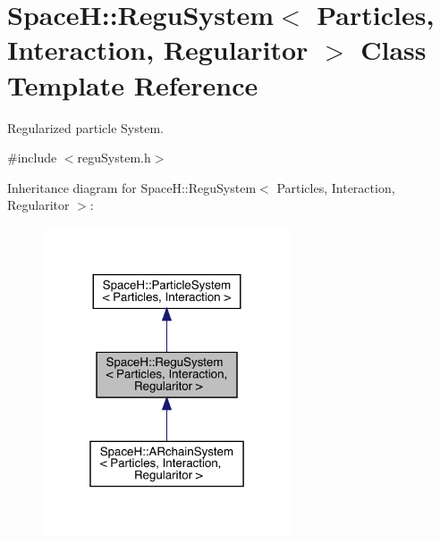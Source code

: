 \hypertarget{class_space_h_1_1_regu_system}{}\section{SpaceH\+:\+:Regu\+System$<$ Particles, Interaction, Regularitor $>$ Class Template Reference}
\label{class_space_h_1_1_regu_system}


Regularized particle System.  




{\ttfamily \#include $<$regu\+System.\+h$>$}



Inheritance diagram for SpaceH\+:\+:Regu\+System$<$ Particles, Interaction, Regularitor $>$\+:
\nopagebreak
\begin{figure}[H]
\begin{center}
\leavevmode
\includegraphics[width=208pt]{class_space_h_1_1_regu_system__inherit__graph}
\end{center}
\end{figure}


